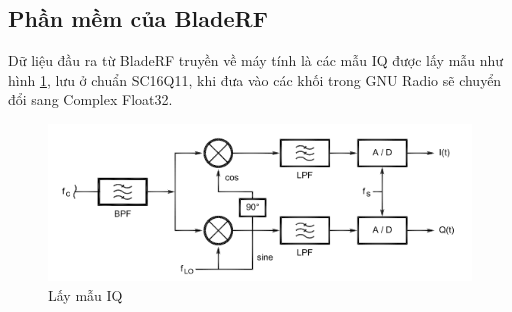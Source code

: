 \subsection{Phần mềm của BladeRF}

Dữ liệu đầu ra từ BladeRF truyền về máy tính là các mẫu IQ được lấy mẫu như hình \ref{fig:IQsample}, lưu ở chuẩn SC16Q11, khi đưa vào các khối trong GNU Radio sẽ chuyển đổi sang Complex Float32.

\begin{figure} [!h]
	\centering
	\includegraphics[width=1\linewidth]{figures/IQsample.png}
	\caption{Lấy mẫu IQ}
	\label{fig:IQsample}
\end{figure}

